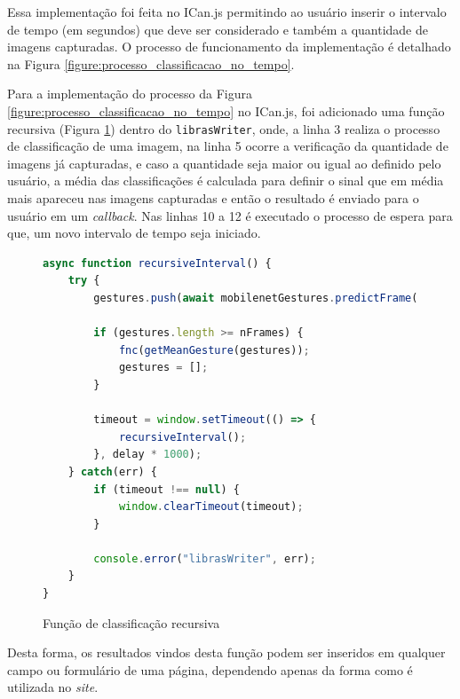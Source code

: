\par Essa implementação foi feita no ICan.js permitindo ao usuário inserir o intervalo de tempo (em segundos) que deve ser considerado e também a quantidade de imagens capturadas. O processo de funcionamento da implementação é detalhado na Figura \ref{figure:processo_classificacao_no_tempo}.


\par Para a implementação do processo da Figura \ref{figure:processo_classificacao_no_tempo} no ICan.js, foi adicionado uma função recursiva (Figura \ref{figure:funcao_recursiva_de_classificacao}) dentro do \texttt{librasWriter}, onde, a linha 3 realiza o processo de classificação de uma imagem, na linha 5 ocorre a verificação da quantidade de imagens já capturadas, e caso a quantidade seja maior ou igual ao definido pelo usuário, a média das classificações é calculada para definir o sinal que em média mais apareceu nas imagens capturadas e então o resultado é enviado para o usuário em um \textit{callback}. Nas linhas 10 a 12 é executado o processo de espera para que, um novo intervalo de tempo seja iniciado.

\begin{figure}[H]
    \centering
    \caption{Função de classificação recursiva}
    \begin{lstlisting}[language=JavaScript]
async function recursiveInterval() {
    try {
        gestures.push(await mobilenetGestures.predictFrame());

        if (gestures.length >= nFrames) {
            fnc(getMeanGesture(gestures));
            gestures = [];
        }

        timeout = window.setTimeout(() => {
            recursiveInterval();
        }, delay * 1000);       
    } catch(err) {
        if (timeout !== null) {
            window.clearTimeout(timeout);
        }

        console.error("librasWriter", err);
    }
}
    \end{lstlisting}
    \label{figure:funcao_recursiva_de_classificacao}
\end{figure}

\par Desta forma, os resultados vindos desta função podem ser inseridos em qualquer campo ou formulário de uma página, dependendo apenas da forma como é utilizada no \textit{site}.

